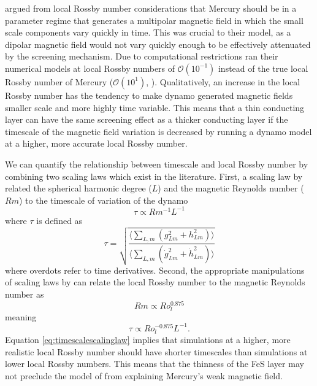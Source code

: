 \citet{christensen06} argued from local Rossby number considerations that Mercury should be in a parameter regime that generates a multipolar magnetic field in which the small scale components vary quickly in time. This was crucial to their model, as a dipolar magnetic field would not vary quickly enough to be effectively attenuated by the screening mechanism. Due to computational restrictions \citet{christensen06} ran their numerical models at local Rossby numbers of $\mathcal{O}\left(10^{-1}\right)$ instead of the true local Rossby number of Mercury ($\mathcal{O}\left(10^{1}\right)$, \citep{OlsonandChristensen2006}). Qualitatively, an increase in the local Rossby number has the tendency to make dynamo generated magnetic fields smaller scale and more highly time variable. This means that a thin conducting layer can have the same screening effect as a thicker conducting layer if the timescale of the magnetic field variation is decreased by running a dynamo model at a higher, more accurate local Rossby number. 

We can quantify the relationship between timescale and local Rossby number by combining two scaling laws which exist in the literature. First, a scaling law by \citet{christensen2004} related the spherical harmonic degree ($L$) and the magnetic Reynolds number ($Rm$) to the timescale of variation of the dynamo
\begin{equation}
\tau\propto Rm^{-1} L^{-1}
\end{equation}
where $\tau$ is defined as
\begin{equation}
\label{eq:timescale}
\tau=\sqrt{\frac{\langle \sum_{L, m} \left(g_{Lm}^2+h_{Lm}^2\right)\rangle}{\langle \sum_{L, m} \left(\dot{g}_{Lm}^2+\dot{h}_{Lm}^2\right)\rangle}}
\end{equation}
where overdots refer to time derivatives. Second, the appropriate manipulations of scaling laws by \citet{aubert2009} can relate the local Rossby number to the magnetic Reynolds number as
\begin{equation}
Rm\propto Ro_{l}^{0.875}
\end{equation}
meaning
\begin{equation}
\tau\propto Ro_{l}^{-0.875} L^{-1}.
\label{eq:timescalescalinglaw}
\end{equation}
Equation \ref{eq:timescalescalinglaw} implies that simulations at a higher, more realistic local Rossby number should have shorter timescales than simulations at lower local Rossby numbers. This means that the thinness of the FeS layer may not preclude the model of \citet{smith2012} from explaining Mercury's weak magnetic field.

